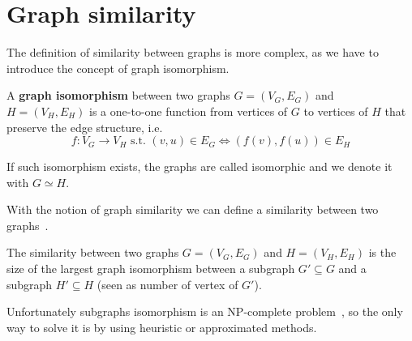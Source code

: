 \section{Graph similarity}

The definition of similarity between graphs is more complex, as we have to introduce the concept of graph isomorphism.

\begin{definizione}
	A \textbf{graph isomorphism} between two graphs $G=(V_{G}, E_{G})$ and $H=(V_{H}, E_{H})$ is a one-to-one function from vertices of $G$ to vertices of $H$ that preserve the edge structure, i.e.  
	\begin{equation}
	f : V_{G} \rightarrow V_{H} \text{ s.t. } (v, u) \in E_{G} \iff (f(v), f(u)) \in E_{H}
	\end{equation}
\end{definizione}

If such isomorphism exists, the graphs are called isomorphic and we denote it with $G \simeq H$.\medskip

With the notion of graph similarity we can define a similarity between two graphs~\cite{Bunke:1998:GDM:289720.289729}.\medskip

\begin{definizione}
	The similarity between two graphs $G=(V_{G}, E_{G})$ and $H=(V_{H}, E_{H})$ is the size of the largest graph isomorphism between a subgraph $G' \subseteq G$ and a subgraph $H' \subseteq H$ (seen as number of vertex of $G'$).
\end{definizione}

Unfortunately subgraphs isomorphism is an NP-complete problem~\cite{GareyJohnson:1979}, so the only way to solve it is by using heuristic or approximated methods.

